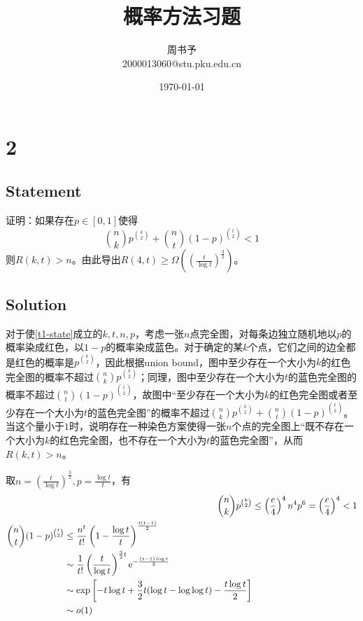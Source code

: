 \documentclass[UTF-8]{ctexart}
\title{\heiti\zihao{1} 概率方法习题}
\author{\kaishu\zihao{-3} 周书予\\2000013060@stu.pku.edu.cn}
\date{\today}
\begin{document}
\maketitle

\section*{2}
\subsection*{Statement}\label{t1}
证明：如果存在$p \in [0, 1]$使得
\begin{equation}
\binom nk p^{\binom k2} + \binom nt (1-p)^{\binom t2} < 1
\label{t1-state}
\end{equation}
则$R(k, t) > n$。由此导出$R(4, t) \ge \Omega\left(\left( \frac{t}{\log t} \right)^{\frac 32}\right)$。

\subsection*{Solution}
对于使\cref{t1-state}成立的$k, t, n, p$，考虑一张$n$点完全图，对每条边独立随机地以$p$的概率染成红色，以$1-p$的概率染成蓝色。对于确定的某$k$个点，它们之间的边全都是红色的概率是$p^{\binom k2}$，因此根据union bound，图中至少存在一个大小为$k$的红色完全图的概率不超过$\binom nk p^{\binom k2}$；同理，图中至少存在一个大小为$t$的蓝色完全图的概率不超过$\binom nt (1-p)^{\binom t2}$，故图中“至少存在一个大小为$k$的红色完全图或者至少存在一个大小为$t$的蓝色完全图”的概率不超过$\binom nk p^{\binom k2} + \binom nt (1-p)^{\binom t2}$。当这个量小于$1$时，说明存在一种染色方案使得一张$n$个点的完全图上“既不存在一个大小为$k$的红色完全图，也不存在一个大小为$t$的蓝色完全图”，从而$R(k, t) > n$。

取$n = \left(\frac{t}{\log t}\right)^{\frac 32}, p = \frac{\log t}{t}$，有
\begin{align}
	\binom nk p^{\binom k2} & \le \left(\frac{e}{4}\right)^4n^4p^6 = \left(\frac{e}{4}\right)^4 < 1\\
	\begin{split}
	\binom nt (1-p)^{\binom t2} &\le \frac{n^t}{t!}\left(1 - \frac{\log t}{t}\right)^{\frac{t(t-1)}{2}}\\&\sim \frac{1}{t!} \left(\frac{t}{\log t}\right)^{\frac 32t}\text e^{-\frac{(t-1)\log t}{2}}\\
	&\sim \exp \left[ -t\log t + \frac{3}{2}t(\log t - \log\log t) - \frac{t\log t}{2}\right]\\
	&\sim o(1)
	\end{split}
\end{align}
\end{document}
